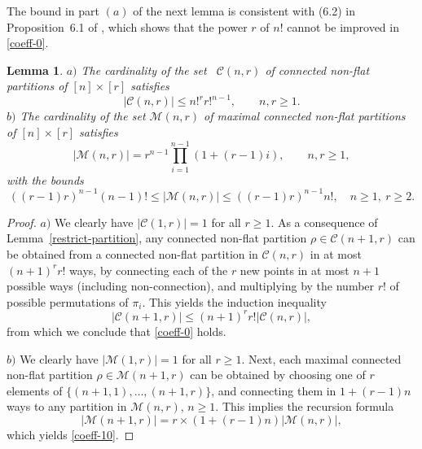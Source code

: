 \documentclass[bj,authoryear,noshowframe]{imsart}
\theoremstyle{plain}
\newtheorem{lemma}[theorem]{Lemma}
\theoremstyle{remark}
\begin{document}
\noindent
 The bound in part $(a)$ of the next lemma is consistent with
 (6.2) in Proposition~6.1 of \cite{schulte-thaele},
 which shows that the power $r$ of $n!$ cannot be improved in \eqref{coeff-0}. 
\begin{lemma}
  \label{fjkldsf-l}
  \noindent
  $a)$ The cardinality of the set \ $\mathcal{C} (n,r)$
 of connected non-flat partitions of $[n]\times[r]$ satisfies 
 \begin{equation}
   \label{coeff-0}
  |\mathcal{C} (n,r) | \leq n!^r r!^{n-1}, 
  \qquad n,r \geq 1. 
\end{equation}
\noindent
$b)$ 
 The cardinality of the set 
$ \mathcal{M}(n,r)$
 of maximal connected non-flat partitions of $[n]\times[r]$ satisfies 
\begin{equation}\label{coeff-10}
  |\mathcal{M}(n,r)|=r^{n-1}\prod_{i=1}^{n-1}(1+(r-1)i),
  \qquad n,r\geq 1, 
\end{equation}
 with the bounds 
\begin{equation}\label{coeff-1}
    ( (r-1)r )^{n-1}(n-1)!\le
    |\mathcal{M}(n,r)|
     \leq ( (r-1)r )^{n-1}n!, \quad n\geq 1, \ r\geq 2. 
\end{equation}
\end{lemma}
\begin{proof}
\noindent
 $a)$ We clearly have $|\mathcal{C} (1,r) | =1$ for all $r\geq 1$. 
 As a consequence of Lemma~\ref{restrict-partition}, 
 any connected non-flat partition $\rho \in \mathcal{C}(n+1,r)$ can be
 obtained from a connected non-flat partition in $\mathcal{C}(n,r)$ in at most
 $(n+1)^r r!$ ways, by connecting each of the $r$ new points
 in at most $n+1$ possible ways (including non-connection),
 and multiplying by the number $r!$ of possible permutations of $\pi_i$. 
 This yields the induction inequality 
 $$
 |\mathcal{C} (n+1,r) | \leq (n+1)^r r! |\mathcal{C} (n,r) |,
 $$
 from which we conclude that \eqref{coeff-0} holds. 
 
 \medskip 

 \noindent
 $b)$ 
 We clearly have $|\mathcal{M}(1,r)|=1$ for all $r\geq 1$. 
 Next, each maximal connected non-flat partition 
 $\rho\in\mathcal{M}(n+1,r)$ can be
   obtained by choosing 
   one of $r$ elements of $\{(n+1,1),\dots,(n+1,r)\}$, 
   and connecting them in $1+(r-1)n$ ways 
   to any partition in $\mathcal{M}(n,r)$, $n\geq 1$.
   This implies the recursion formula 
   $$|\mathcal{M}(n+1,r)|=r\times (1+(r-1)n)|\mathcal{M}(n,r)|,
   $$
 which yields \eqref{coeff-10}.
\end{proof} 
\end{document}
